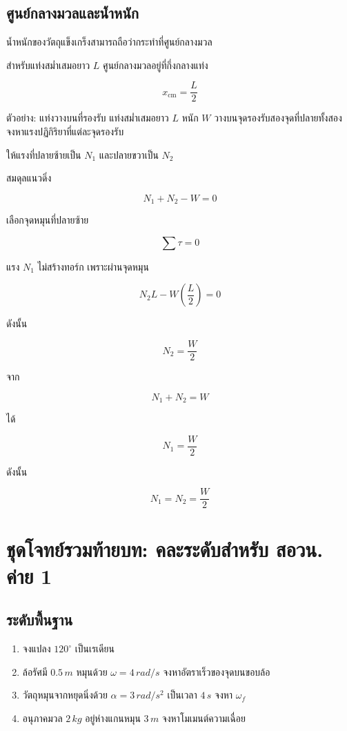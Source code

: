 \subsection{ศูนย์กลางมวลและน้ำหนัก}

น้ำหนักของวัตถุแข็งเกร็งสามารถถือว่ากระทำที่ศูนย์กลางมวล

สำหรับแท่งสม่ำเสมอยาว $L$ ศูนย์กลางมวลอยู่ที่กึ่งกลางแท่ง

\[
x_{\text{cm}}=\frac{L}{2}
\]

\begin{examplebox}{ตัวอย่าง: แท่งวางบนที่รองรับ}
แท่งสม่ำเสมอยาว $L$ หนัก $W$ วางบนจุดรองรับสองจุดที่ปลายทั้งสอง จงหาแรงปฏิกิริยาที่แต่ละจุดรองรับ

ให้แรงที่ปลายซ้ายเป็น $N_1$ และปลายขวาเป็น $N_2$

สมดุลแนวดิ่ง

\[
N_1+N_2-W=0
\]

เลือกจุดหมุนที่ปลายซ้าย

\[
\sum\tau=0
\]

แรง $N_1$ ไม่สร้างทอร์ก เพราะผ่านจุดหมุน

\[
N_2L-W\left(\frac{L}{2}\right)=0
\]

ดังนั้น

\[
N_2=\frac{W}{2}
\]

จาก

\[
N_1+N_2=W
\]

ได้

\[
N_1=\frac{W}{2}
\]

ดังนั้น

\[
\boxed{N_1=N_2=\frac{W}{2}}
\]
\end{examplebox}

\section{ชุดโจทย์รวมท้ายบท: คละระดับสำหรับ สอวน. ค่าย 1}

\subsection*{ระดับพื้นฐาน}

\begin{enumerate}
    \item จงแปลง $120^\circ$ เป็นเรเดียน
    \item ล้อรัศมี $0.5\,\si{m}$ หมุนด้วย $\omega=4\,\si{rad/s}$ จงหาอัตราเร็วของจุดบนขอบล้อ
    \item วัตถุหมุนจากหยุดนิ่งด้วย $\alpha=3\,\si{rad/s^2}$ เป็นเวลา $4\,\si{s}$ จงหา $\omega_f$
    \item อนุภาคมวล $2\,\si{kg}$ อยู่ห่างแกนหมุน $3\,\si{m}$ จงหาโมเมนต์ความเฉื่อย
\end{enumerate}

